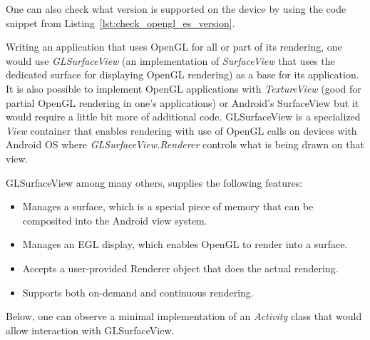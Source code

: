 \documentclass[a4paper,11pt]{article}
\newenvironment{filecode}[1][]
  {\minipage{\linewidth}%
   \lstset{basicstyle=\ttfamily\footnotesize,#1}}
  {\endminipage}%
\renewenvironment{abstract}
{\itshape \small
  \begin{center}
  \bfseries \abstractname\vspace{-.5em}\vspace{0pt}
  \end{center}
  \list{}{
    \setlength{\leftmargin}{1.5cm}%
    \setlength{\rightmargin}{\leftmargin}%
  }%
  \item\relax}
{\endlist}
\begin{document}
\begin{abstract}
%  

One can also check what version is supported on the device by using the code snippet from Listing~\ref{lst:check_opengl_es_version}.

\begin{filecode}[label=lst:check_opengl_es_version,caption=Checking OpenGL ES version support on the device.]
  
\end{filecode}

%

Writing an application that uses OpenGL for all or part of its rendering, one would use \emph{GLSurfaceView} (an implementation of \emph{SurfaceView} that uses the dedicated surface for displaying OpenGL rendering) \cite{android_glsurfaceview} as a base for its application.
It is also possible to implement OpenGL applications with \emph{TextureView} (good for partial OpenGL rendering in one's applications) or Android's SurfaceView but it would require a little bit more of additional code.
\newline GLSurfaceView is a specialized \emph{View} container that enables rendering with use of OpenGL calls on devices with Android OS where \emph{GLSurfaceView.Renderer} controls what is being drawn on that view.

GLSurfaceView among many others, supplies the following features:
\begin{itemize}
\item Manages a surface, which is a special piece of memory that can be composited into the Android view system.
\item Manages an EGL display, which enables OpenGL to render into a surface.
\item Accepts a user-provided Renderer object that does the actual rendering.
\item Supports both on-demand and continuous rendering.
\end{itemize}

Below, one can observe a minimal implementation of an \emph{Activity} class \cite{android_activity} that would allow interaction with GLSurfaceView.


\end{abstract}
\end{document}

